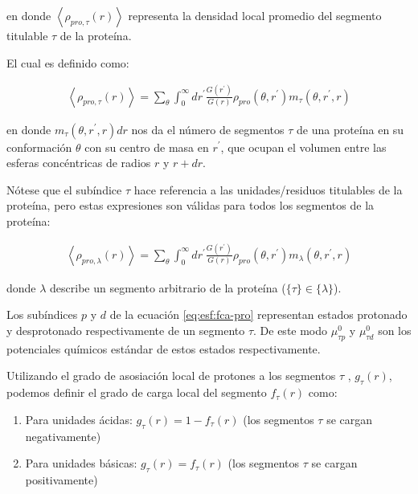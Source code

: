\noindent en donde $\left<\rho_{pro,\tau}(r)\right>$ representa la densidad local promedio del segmento titulable $\tau$ de la prote\'ina.

El cual es definido como:


\begin{align}
	\left<\rho_{pro,\tau}(r)\right> = \sum_\theta \int_0^\infty dr^\prime \frac{G(r^\prime)}{G(r)} \rho_{pro}(\theta,r^\prime)m_\tau(\theta,r^\prime,r)
	\label{eq:esf:segments-pro-vector}
\end{align}


\noindent en donde $m_\tau(\theta,r^\prime,r) dr$  nos da el n\'umero de segmentos $\tau$  de una prote\'ina en su conformaci\'on $\theta$ con su centro de masa en $r^\prime$, que ocupan el volumen entre las esferas conc\'entricas de radios $r$ y $r + dr$.



N\'otese que el sub\'indice  $\tau$ hace referencia a las unidades/residuos titulables de la prote\'ina, pero estas expresiones son v\'alidas para todos los segmentos de la prote\'ina:

\begin{align}
	\left<\rho_{pro,\lambda}(r)\right> = \sum_\theta \int_0^\infty dr^\prime \frac{G(r^\prime)}{G(r)} \rho_{pro}(\theta,r^\prime)m_\lambda(\theta,r^\prime,r)
	\label{eq:esf:segments-pro}
\end{align}



\noindent donde $\lambda$  describe un segmento arbitrario de la prote\'ina ($\{\tau\}\in\{\lambda\}$).

Los sub\'indices $p$ y $d$  de la ecuaci\'on \ref{eq:esf:fca-pro} representan estados protonado y desprotonado respectivamente de un segmento $\tau$. 
De este modo $\mu^0_{\tau p}$ y $\mu^0_{\tau d}$  son los potenciales qu\'imicos est\'andar de estos estados respectivamente.

Utilizando el grado de asosiaci\'on local de protones a los segmentos $\tau$ , $g_\tau (r)$, podemos definir el grado de carga local del segmento $f_\tau (r)$ como:
 
\begin{enumerate}
	\item Para unidades \'acidas: $g_\tau(r) = 1-f_\tau(r)$ (los segmentos $\tau$ se cargan negativamente)
	\item Para unidades b\'asicas: $g_\tau(r) = f_\tau(r)$ (los segmentos $\tau$ se cargan positivamente)
\end{enumerate}

